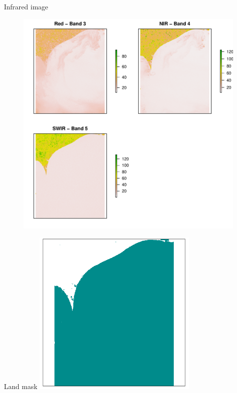 \documentclass[10pt]{beamer}
\begin{document}
\begin{frame}{Infrared image}
\begin{figure}
\centering
\includegraphics[width=.7\textwidth]{images/rgbFalse.pdf}
\end{figure}  
\end{frame}

\begin{frame}{Land mask}
   \centering
    \includegraphics[width=0.6\textwidth]{images/mask.png} 
\end{frame}
\end{document}
